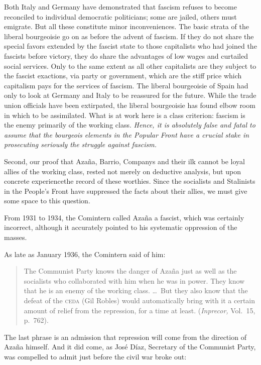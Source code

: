 Both Italy and Germany have demonstrated that fascism refuses to become reconciled to individual democratic politicians; some are jailed, others must emigrate. But all these constitute minor inconveniences. The basic strata of the liberal bourgeoisie go on as before the advent of fascism. If they do not share the special favors extended by the fascist state to those capitalists who had joined the fascists before victory, they do share the advantages of low wages and curtailed social services. Only to the same extent as all other capitalists are they subject to the fascist exactions, via party or government, which are the stiff price which capitalism pays for the services of fascism. The liberal bourgeoisie of Spain had only to look at Germany and Italy to be reassured for the future. While the trade union officials have been extirpated, the liberal bourgeoisie has found elbow room in which to be assimilated.
What is at work here is a class criterion: fascism is the enemy primarily of the working class. \emph{Hence, it is absolutely false and fatal to assume that the bourgeois elements in the Popular Front have a crucial stake in prosecuting seriously the struggle against fascism.}

Second, our proof that Azaña, Barrio, Companys and their ilk cannot be loyal allies of the working class, rested not merely on deductive analysis, but upon concrete experience\textemdash{}the record of these worthies. Since the socialists and Stalinists in the People’s Front have suppressed the facts about their allies, we must give some space to this question.

From 1931 to 1934, the Comintern called Azaña{\indexMAzana} a fascist, which was certainly incorrect, although it accurately pointed to his systematic oppression of the masses.

As late as January 1936, the Comintern said of him:

\begin{quotation}
  The Communist Party knows the danger of Azaña just as well as the socialists who collaborated with him when he was in power. They know that he is an enemy of the working class. \dots\ But they also know that the defeat of the \textsc{ceda} (Gil Robles) would automatically bring with it a certain amount of relief from the repression, for a time at least. (\emph{Inprecor,} Vol.~15, p.~762).
\end{quotation}

The last phrase is an admission that repression will come from the direction of Azaña himself. And it did come, as José Díaz, Secretary of the Communist Party, was compelled to admit just before the civil war broke out:


